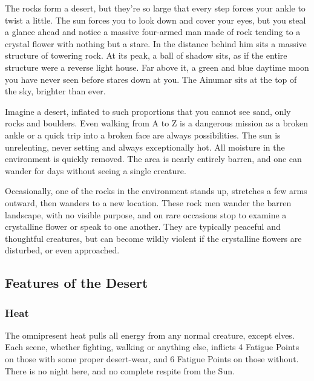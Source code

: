 \begin{multicols}{2}

\encDesert


\begin{boxtext}

  The rocks form a desert, but they're so large that every step forces your ankle to twist a little.
  The sun forces you to look down and cover your eyes, but you steal a glance ahead and notice a massive four-armed man made of rock tending to a crystal flower with nothing but a stare.
  In the distance behind him sits a massive structure of towering rock.
  At its peak, a ball of shadow sits, as if the entire structure were a reverse light house.
  Far above it, a green and blue daytime moon you have never seen before stares down at you.
  The Ainumar sits at the top of the sky, brighter than ever.

\end{boxtext}

\noindent
Imagine a desert, inflated to such proportions that you cannot see sand, only rocks and boulders.
Even walking from A to Z is a dangerous mission as a broken ankle or a quick trip into a broken face are always possibilities.  The sun is unrelenting, never setting and always exceptionally hot.  All moisture in the environment is quickly removed.  The area is nearly entirely barren, and one can wander for days without seeing a single creature.

Occasionally, one of the rocks in the environment stands up, stretches a few arms outward, then wanders to a new location.
These rock men wander the barren landscape, with no visible purpose, and on rare occasions stop to examine a crystalline flower or speak to one another.
They are typically peaceful and thoughtful creatures, but can become wildly violent if the crystalline flowers are disturbed, or even approached.

\subsection{Features of the Desert}

\subsubsection{Heat}

The omnipresent heat pulls all energy from any normal creature, except elves.
Each scene, whether fighting, walking or anything else, inflicts 4 Fatigue Points on those with some proper desert-wear, and 6 Fatigue Points on those without.
There is no night here, and no complete respite from the Sun.


\end{multicols}
